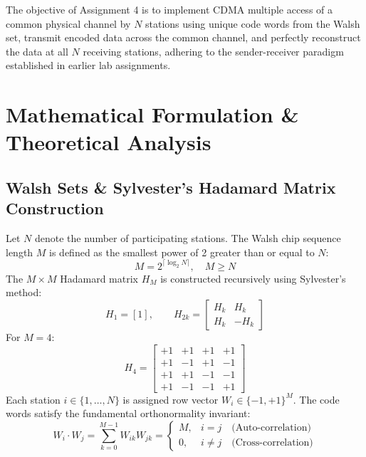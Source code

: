 \documentclass[11pt,a4paper]{article}
\begin{document}
The objective of Assignment 4 is to implement CDMA multiple access of a common physical channel by $N$ stations using unique code words from the Walsh set, transmit encoded data across the common channel, and perfectly reconstruct the data at all $N$ receiving stations, adhering to the sender-receiver paradigm established in earlier lab assignments.

\section{Mathematical Formulation \& Theoretical Analysis}

\subsection{Walsh Sets \& Sylvester's Hadamard Matrix Construction}
Let $N$ denote the number of participating stations. The Walsh chip sequence length $M$ is defined as the smallest power of 2 greater than or equal to $N$:
\begin{equation}
M = 2^{\lceil \log_2 N \rceil}, \quad M \ge N
\end{equation}
The $M \times M$ Hadamard matrix $H_M$ is constructed recursively using Sylvester's method:
\begin{equation}
H_1 = [1], \qquad H_{2k} = \begin{bmatrix} H_k & H_k \\ H_k & -H_k \end{bmatrix}
\end{equation}
For $M = 4$:
\begin{equation}
H_4 = \begin{bmatrix}
+1 & +1 & +1 & +1 \\
+1 & -1 & +1 & -1 \\
+1 & +1 & -1 & -1 \\
+1 & -1 & -1 & +1
\end{bmatrix}
\end{equation}
Each station $i \in \{1, \dots, N\}$ is assigned row vector $W_i \in \{-1, +1\}^M$. The code words satisfy the fundamental orthonormality invariant:
\begin{equation}
W_i \cdot W_j = \sum_{k=0}^{M-1} W_{ik} W_{jk} = \begin{cases} M, & i = j \quad \text{(Auto-correlation)} \\ 0, & i \ne j \quad \text{(Cross-correlation)} \end{cases}
\end{equation}
\end{document}
